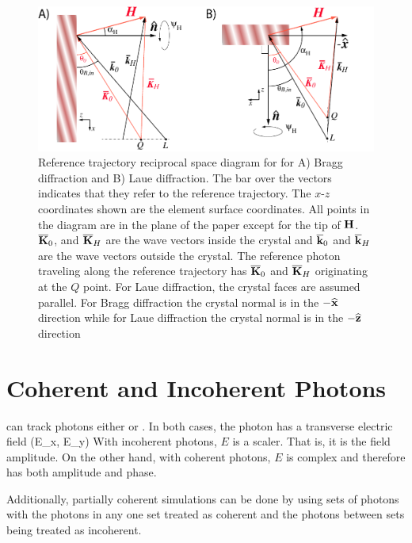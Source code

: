 \begin{figure}[tb]
  \centering
  \includegraphics[width=5in]{crystal-diffraction.pdf}
  \caption[Reference trajectory reciprocal space diagram for crystal diffraction.]
{Reference trajectory reciprocal space diagram for for A) Bragg
diffraction and B) Laue diffraction. The bar over the vectors
indicates that they refer to the reference trajectory. The $x$-$z$
coordinates shown are the element surface coordinates. All points in the
diagram are in the plane of the paper except for the tip of ${\bf H}$.
$\overline{{\bf K}}_{0}$, and $\overline{{\bf K}}_{H}$ are the wave vectors inside the
crystal and $\overline{{\bf k}}_{0}$ and $\overline{{\bf k}}_{H}$ are the wave vectors
outside the crystal. The reference photon traveling along the
reference trajectory has $\overline{{\bf K}}_0$ and $\overline{{\bf K}}_H$ originating at
the $Q$ point. For Laue diffraction, the crystal faces are assumed
parallel.  For Bragg diffraction the crystal normal is in the $-{\widehat{\bf x}}$ direction while for Laue diffraction the crystal normal is in the
$-{\widehat{\bf z}}$ direction
  }
  \label{f:crystal.diffraction}
\end{figure}

\section{Coherent and Incoherent Photons}
\label{s:coher.incoher}

\bmad can track photons either  or .
In both cases, the photon has a transverse electric field 
\Begineq
  (E_x, E_y)
\Endeq
With incoherent photons, $E$ is a scaler. That is, it is the field amplitude.
On the other hand, with coherent photons, $E$ is complex and therefore has 
both amplitude and phase.

Additionally, partially coherent simulations can be done by using sets
of photons with the photons in any one set treated as coherent and the
photons between sets being treated as incoherent.

